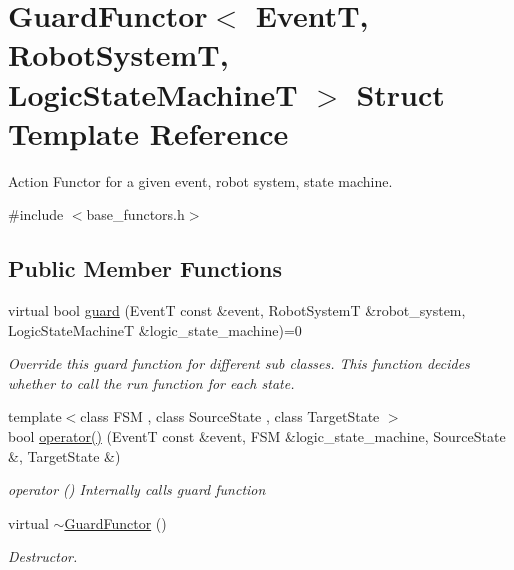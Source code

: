 \hypertarget{structGuardFunctor}{\section{Guard\-Functor$<$ Event\-T, Robot\-System\-T, Logic\-State\-Machine\-T $>$ Struct Template Reference}
\label{structGuardFunctor}
}


Action Functor for a given event, robot system, state machine.  




{\ttfamily \#include $<$base\-\_\-functors.\-h$>$}

\subsection*{Public Member Functions}
\begin{DoxyCompactItemize}
\item 
virtual bool \hyperlink{structGuardFunctor_a9f023aa88503d6127cc8280d7dc733b8}{guard} (Event\-T const \&event, Robot\-System\-T \&robot\-\_\-system, Logic\-State\-Machine\-T \&logic\-\_\-state\-\_\-machine)=0
\begin{DoxyCompactList}\small\item\em Override this guard function for different sub classes. This function decides whether to call the run function for each state. \end{DoxyCompactList}\item 
{\footnotesize template$<$class F\-S\-M , class Source\-State , class Target\-State $>$ }\\bool \hyperlink{structGuardFunctor_a42b30d1737ceca71bfe47a9bb525ceda}{operator()} (Event\-T const \&event, F\-S\-M \&logic\-\_\-state\-\_\-machine, Source\-State \&, Target\-State \&)
\begin{DoxyCompactList}\small\item\em operator () Internally calls guard function \end{DoxyCompactList}\item 
virtual \hyperlink{structGuardFunctor_a3876b6e5028dcdc35ac786322e8afca3}{$\sim$\-Guard\-Functor} ()
\begin{DoxyCompactList}\small\item\em Destructor. \end{DoxyCompactList}\end{DoxyCompactItemize}


